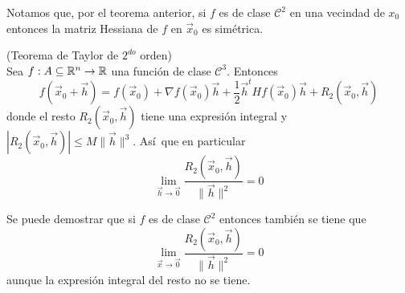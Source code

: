\begin{nota} 
Notamos que, por el teorema anterior, si
$f$ es de clase $\mathcal{C}^2$ en una vecindad de $x_0$ entonces  la matriz Hessiana de
$f$ en $\vec{x}_0$ es sim\'etrica.
\end{nota}

\begin{teorema}{\rm (Teorema de Taylor de $2^{do}$ orden)}\label{taylor2}
\\Sea $\f1$ una funci\'on de clase $\mathcal{C}^3$. Entonces
$$ f(\vec{x}_0+\vec{h})=f(\vec{x}_0)+\nabla f(\vec{x}_0)\vec{h}+\frac{1}{2}\vec{h}^t Hf(\vec{x}_0)\vec{h}+R_2(\vec{x}_0,\vec{h})$$
donde el resto $R_2(\vec{x}_0,\vec{h})$ tiene una expresi\'on integral y
$|R_2(\vec{x}_0,\vec{h})|\leq M\|\vec{h}\|^3$. As\'i\ que en particular
$$
\lim_{\vec{h}\to
\vec{0}}\frac{R_2(\vec{x}_0,\vec{h})}{\|\vec{h}\|^2}=0
$$
\end{teorema}

\begin{nota} 
Se puede demostrar que si $f$ es de
clase $\mathcal{C}^2$ entonces tambi\'en se tiene que $$\lim_{\vec{x}\to
\vec{0}}\frac{R_2(\vec{x}_0,\vec{h})}{\|\vec{h}\|^2}=0$$
aunque la expresi\'on integral del resto no se tiene.
\end{nota}

